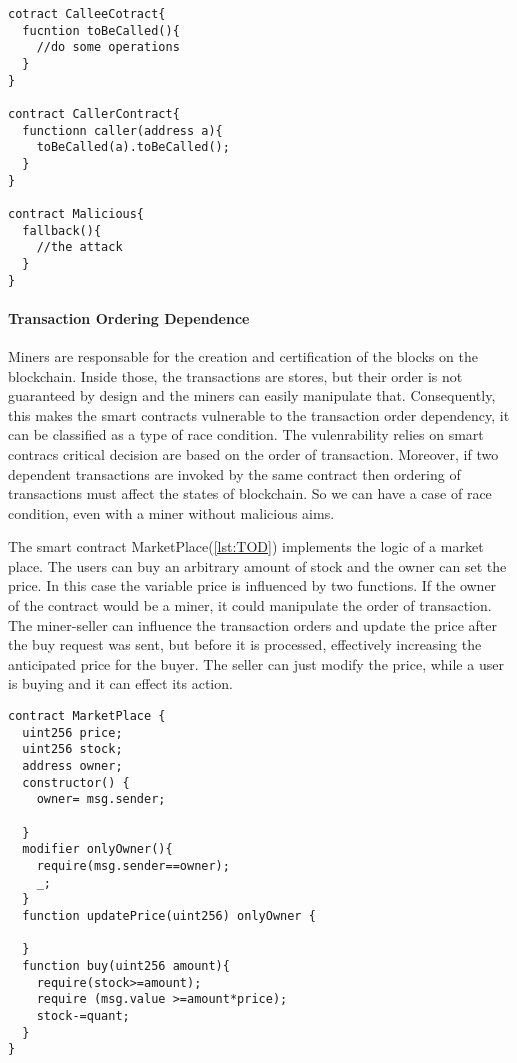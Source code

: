 \documentclass[a4paper,sigconf, language=french,
language=german, language=spanish, language=english]{acmart}
\begin{document}
\begin{lstlisting}[language=Solidity,caption={Call to the unknown},label={lst:CallToUnknown}]
cotract CalleeCotract{ 
  fucntion toBeCalled(){
    //do some operations
  }
}

contract CallerContract{
  functionn caller(address a){
    toBeCalled(a).toBeCalled();
  }
}

contract Malicious{
  fallback(){
    //the attack
  }
}
\end{lstlisting}

\paragraph{Transaction Ordering Dependence} Miners are responsable for the creation and certification of 
the blocks on the blockchain. Inside those, the transactions are stores, but their order is not guaranteed by 
design and the miners can easily manipulate that. Consequently, this makes the smart contracts vulnerable to the transaction
order dependency, it can be classified as a type of race condition. The vulenrability relies on smart contracs critical decision 
are based on the order of transaction. Moreover, if two dependent transactions are invoked by the same contract then ordering of transactions must affect the states of blockchain. 
So we can have a case of race condition, even with a miner without malicious aims.

The smart contract MarketPlace(\autoref{lst:TOD}) implements the logic of a market place. The users can buy an arbitrary amount of stock and the 
owner can set the price. In this case the variable price is influenced by two functions. If the owner of the contract would be a miner, it could 
manipulate the order of transaction. The miner-seller can inﬂuence the transaction orders and update the price after the buy request was 
sent, but before it is processed, eﬀectively increasing the anticipated price for the buyer. The seller can just modify the price, while a user is buying and it can effect its action.

\begin{lstlisting}[language=Solidity,caption={Transaction Ordering Dependence},label={lst:TOD}]
contract MarketPlace {
  uint256 price;
  uint256 stock;
  address owner;
  constructor() {
    owner= msg.sender;

  }
  modifier onlyOwner(){
    require(msg.sender==owner);
    _;
  }
  function updatePrice(uint256) onlyOwner {

  }
  function buy(uint256 amount){
    require(stock>=amount);
    require (msg.value >=amount*price);
    stock-=quant;
  }
}
\end{lstlisting}
\end{document}
